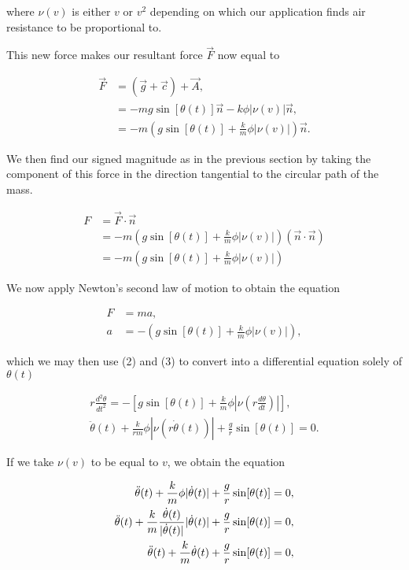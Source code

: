\documentclass{article}
\begin{document}
where $\nu(v)$ is either $v$ or $v^2$ depending on which our application finds air resistance to be proportional to.

This new force makes our resultant force $\vec{F}$ now equal to

\begin{align*}
	\vec{F} &= (\vec{g} + \vec{c}) + \vec{A}, \\
	&= -mg\sin[\theta(t)]\vec{n} - k\phi|\nu(v)|\vec{n}, \\
	&= -m(g\sin[\theta(t)] + \frac{k}{m}\phi|\nu(v)|)\vec{n}.
\end{align*}

We then find our signed magnitude as in the previous section by taking the component of this force in the direction tangential to the circular path of the mass.

\begin{align*}
	F &= \vec{F}\cdot\vec{n} \\
	&= -m(g\sin[\theta(t)] + \frac{k}{m}\phi|\nu(v)|)(\vec{n}\cdot\vec{n}) \\
	&= -m(g\sin[\theta(t)] + \frac{k}{m}\phi|\nu(v)|)
\end{align*}

We now apply Newton's second law of motion to obtain the equation

\begin{align*}
	F &= ma,  \\
	a &= -\left(g\sin[\theta(t)] + \frac{k}{m}\phi|\nu(v)|\right),
\end{align*}

which we may then use (2) and (3) to convert into a differential equation solely of $\theta(t)$

\begin{align*}
	r \frac{d^2\theta}{dt^2} = -\left[g\sin[\theta(t)] + \frac{k}{m}\phi\left|\nu\left(r \frac{d\theta}{dt}\right)\right|\right], \\
	\ddot{\theta}(t) + \frac{k}{rm}\phi|\nu(r\dot{\theta}(t))| + \frac{g}{r}\sin[\theta(t)] = 0.
\end{align*}

If we take $\nu(v)$ to be equal to $v$, we obtain the equation

\begin{align}
	\ddot{\theta}(t) + \frac{k}{m}\phi|\dot{\theta}(t)| + \frac{g}{r}\sin[\theta(t)] = 0, \notag \\
	\ddot{\theta}(t) + \frac{k}{m}\frac{\dot{\theta}(t)}{|\dot{\theta}(t)|}|\dot{\theta}(t)| + \frac{g}{r}\sin[\theta(t)] = 0, \notag \\
	\ddot{\theta}(t) + \frac{k}{m}\dot{\theta}(t) + \frac{g}{r}\sin[\theta(t)] = 0,
\end{align}
\end{document}
